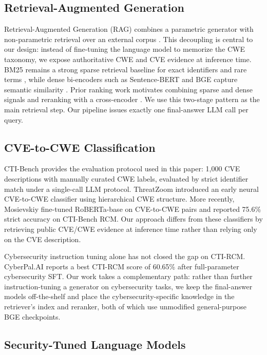 \subsection{Retrieval-Augmented Generation}

Retrieval-Augmented Generation (RAG) combines a parametric generator with non-parametric retrieval over an external corpus \cite{lewis-2020}. This decoupling is central to our design: instead of fine-tuning the language model to memorize the CWE taxonomy, we expose authoritative CWE and CVE evidence at inference time. BM25 remains a strong sparse retrieval baseline for exact identifiers and rare terms \cite{robertson-2009}, while dense bi-encoders such as Sentence-BERT and BGE capture semantic similarity \cite{reimers-2019,xiao-2024}. Prior ranking work motivates combining sparse and dense signals and reranking with a cross-encoder \cite{lin-2021,nogueira-2019}. We use this two-stage pattern as the main retrieval step. Our pipeline issues exactly one final-answer LLM call per query.

\subsection{CVE-to-CWE Classification}

CTI-Bench \cite{alam-2024} provides the evaluation protocol used in this paper: 1{,}000 CVE descriptions with manually curated CWE labels, evaluated by strict identifier match under a single-call LLM protocol. ThreatZoom \cite{aghaei-2020} introduced an early neural CVE-to-CWE classifier using hierarchical CWE structure. More recently, Mosievskiy \cite{mosievskiy-2026} fine-tuned RoBERTa-base on CVE-to-CWE pairs and reported 75.6\% strict accuracy on CTI-Bench RCM. Our approach differs from these classifiers by retrieving public CVE/CWE evidence at inference time rather than relying only on the CVE description.

Cybersecurity instruction tuning alone has not closed the gap on CTI-RCM. CyberPal.AI \cite{levi-2024} reports a best CTI-RCM score of 60.65\% after full-parameter cybersecurity SFT. Our work takes a complementary path: rather than further instruction-tuning a generator on cybersecurity tasks, we keep the final-answer models off-the-shelf and place the cybersecurity-specific knowledge in the retriever's index and reranker, both of which use unmodified general-purpose BGE checkpoints.

\subsection{Security-Tuned Language Models}

